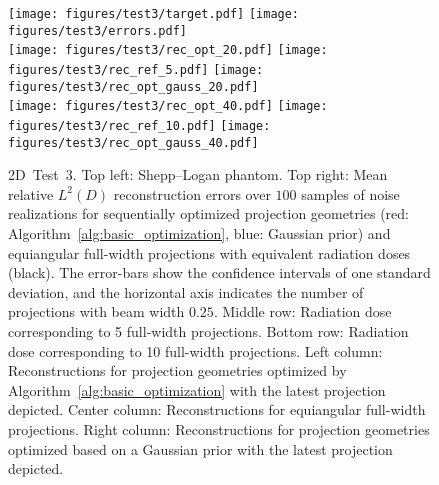 \documentclass[final]{siamltex}
\begin{document}
\begin{figure}
	\centering
	\texttt{[image: figures/test3/target.pdf]}
	\texttt{[image: figures/test3/errors.pdf]} \\[2mm]
	\texttt{[image: figures/test3/rec\_opt\_20.pdf]}
	\texttt{[image: figures/test3/rec\_ref\_5.pdf]}
        \texttt{[image: figures/test3/rec\_opt\_gauss\_20.pdf]}\\[2mm]
        \texttt{[image: figures/test3/rec\_opt\_40.pdf]}
	\texttt{[image: figures/test3/rec\_ref\_10.pdf]}
        \texttt{[image: figures/test3/rec\_opt\_gauss\_40.pdf]}
	\caption{{\sc 2D~Test~3.} Top left: Shepp--Logan phantom. Top right: Mean relative $L^2(D)$ reconstruction errors over $100$ samples of noise realizations for sequentially optimized projection geometries (red: Algorithm~\ref{alg:basic_optimization}, blue: Gaussian prior) and equiangular full-width projections with equivalent radiation doses (black). The error-bars show the confidence intervals of one standard deviation, and the horizontal axis indicates the number of projections with beam width $0.25$. Middle row: Radiation dose corresponding to 5 full-width projections. Bottom row: Radiation dose corresponding to 10 full-width projections. Left column: Reconstructions for projection geometries optimized by Algorithm~\ref{alg:basic_optimization} with the latest projection depicted. Center column: Reconstructions for equiangular full-width projections. Right column: Reconstructions for projection geometries optimized based on a Gaussian prior with the latest projection depicted.}
	\label{fig:test3}
\end{figure}
\end{document}
